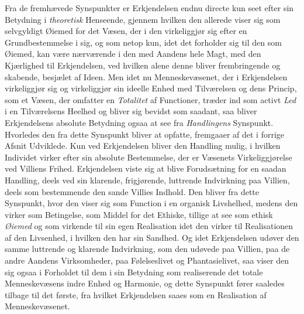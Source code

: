 Fra de fremhævede Synspunkter er Erkjendelsen endnu directe kun seet efter sin
Betydning i \emph{theoretisk} Henseende, gjennem hvilken den allerede viser sig
som selvgyldigt Øiemed for det Væsen, der i den virkeliggjør sig efter en
Grundbestemmelse i sig, og som netop kun, idet det forholder sig til den som
Øiemed, kan være nærværende i den med Aandens hele Magt, med den Kjærlighed til
Erkjendelsen, ved hvilken alene denne bliver frembringende og skabende,
besjælet af Ideen. Men idet nu Menneskevæsenet, der i Erkjendelsen
virkeliggjør sig og virkeliggjør sin ideelle Enhed med Tilværelsen og dens
Princip, som et Væsen, der omfatter en \emph{Totalitet} af Functioner, træder
ind som activt \emph{Led} i en Tilværelsens Heelhed og bliver sig bevidst som
saadant, saa bliver Erkjendelsens absolute Betydning ogsaa at see fra
\emph{Handlingens} Synspunkt. Hvorledes den fra
 dette Synspunkt bliver at opfatte, fremgaaer af det i forrige Afsnit Udviklede.
Kun ved Erkjendelsen bliver den Handling mulig, i hvilken Individet virker
efter sin absolute Bestemmelse, der er Væsenets Virkeliggjørelse ved Villiens
Frihed. Erkjendelsen viste sig at blive Forudsætning for en saadan Handling,
deels ved sin klarende, frigjørende, luttrende Indvirkning paa Villien, deels
som bestemmende den sande Villies Indhold. Den bliver fra dette Synspunkt, hvor
den viser sig som Function i en organisk Livshelhed, medens den virker som
Betingelse, som Middel for det Ethiske, tillige at see som ethisk
\emph{Øiemed} og som virkende til sin egen Realisation idet den virker til
Realisationen af den Livsenhed, i hvilken den har sin Sandhed. Og idet
Erkjendelsen udøver den samme luttrende og klarende Indvirkning, som den
udøvede paa Villien, paa de andre Aandens Virksomheder, paa Følelseslivet og
Phantasielivet, saa viser den sig ogsaa i Forholdet til dem i sin Betydning som
realiserende det totale Menneskevæsens indre Enhed og Harmonie, og dette
Synspunkt fører saaledes tilbage til det første, fra hvilket Erkjendelsen saaes
som en Realisation af Menneskevæsenet.

